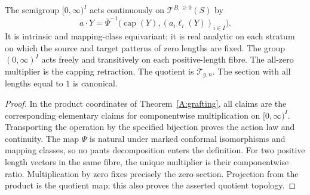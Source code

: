 \begin{corollary}\label{A:action}
The semigroup $[0,\infty)^I$ acts continuously on
$\mathcal T^{B,\geq0}(S)$ by
\[
 a\cdot Y=\overline\Psi^{-1}
 \bigl(\operatorname{cap}(Y),(a_i\ell_i(Y))_{i\in I}\bigr).
\]
It is intrinsic and mapping-class equivariant; it is real analytic
on each stratum on which the source and target patterns of zero
lengths are fixed. The group $(0,\infty)^I$ acts freely and
transitively on each positive-length fibre. The all-zero multiplier
is the capping retraction. The quotient is $\mathcal T_{g,n}$.
The section with all lengths equal to $1$ is canonical.
\end{corollary}
\begin{proof}
In the product coordinates of Theorem~\ref{A:grafting}, all claims
are the corresponding elementary claims for componentwise
multiplication on $[0,\infty)^I$. Transporting the operation by the
specified bijection proves the action law and continuity. The map
$\Psi$ is natural under marked conformal isomorphisms and mapping
classes, so no pants decomposition enters the definition. For two
positive length vectors in the same fibre, the unique multiplier
is their componentwise ratio. Multiplication by zero fixes precisely
the zero section. Projection from the product is the quotient map;
this also proves the asserted quotient topology.
\end{proof}

